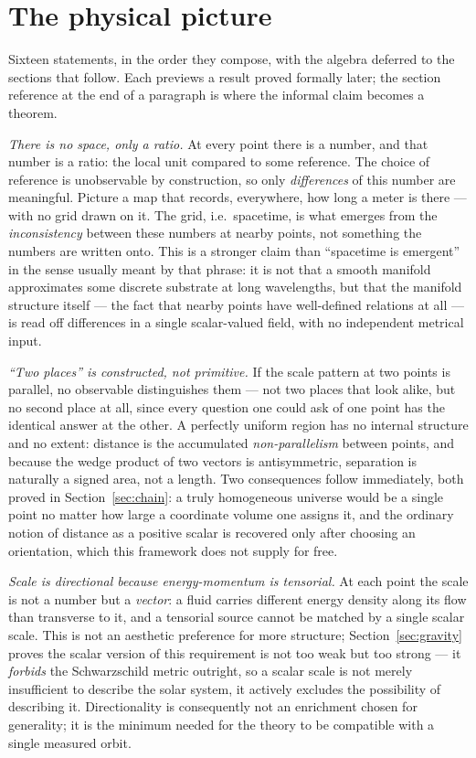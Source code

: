 \documentclass[aps,prd,twocolumn,superscriptaddress,nofootinbib]{revtex4-2}
\begin{document}
\section{The physical picture}\label{sec:picture}

Sixteen statements, in the order they compose, with the algebra deferred
to the sections that follow. Each previews a result proved formally
later; the section reference at the end of a paragraph is where the
informal claim becomes a theorem.

\emph{There is no space, only a ratio.} At every point there is a
number, and that number is a ratio: the local unit compared to some
reference. The choice of reference is unobservable by construction, so
only \emph{differences} of this number are meaningful. Picture a map
that records, everywhere, how long a meter is there — with no grid drawn
on it. The grid, i.e.\ spacetime, is what emerges from the
\emph{inconsistency} between these numbers at nearby points, not
something the numbers are written onto. This is a stronger claim than
``spacetime is emergent'' in the sense usually meant by that phrase: it
is not that a smooth manifold approximates some discrete substrate at
long wavelengths, but that the manifold structure itself — the fact that
nearby points have well-defined relations at all — is read off
differences in a single scalar-valued field, with no independent
metrical input.

\emph{``Two places'' is constructed, not primitive.} If the scale
pattern at two points is parallel, no observable distinguishes them —
not two places that look alike, but no second place at all, since every
question one could ask of one point has the identical answer at the
other. A perfectly uniform region has no internal structure and no
extent: distance is the accumulated \emph{non-parallelism} between
points, and because the wedge product of two vectors is antisymmetric,
separation is naturally a signed area, not a length. Two consequences
follow immediately, both proved in Section~\ref{sec:chain}: a truly
homogeneous universe would be a single point no matter how large a
coordinate volume one assigns it, and the ordinary notion of distance as
a positive scalar is recovered only after choosing an orientation, which
this framework does not supply for free.

\emph{Scale is directional because energy-momentum is tensorial.} At
each point the scale is not a number but a \emph{vector}: a fluid
carries different energy density along its flow than transverse to it,
and a tensorial source cannot be matched by a single scalar scale. This
is not an aesthetic preference for more structure; Section~\ref{sec:gravity}
proves the scalar version of this requirement is not too weak but too
strong — it \emph{forbids} the Schwarzschild metric outright, so a
scalar scale is not merely insufficient to describe the solar system, it
actively excludes the possibility of describing it. Directionality is
consequently not an enrichment chosen for generality; it is the minimum
needed for the theory to be compatible with a single measured orbit.
\end{document}
